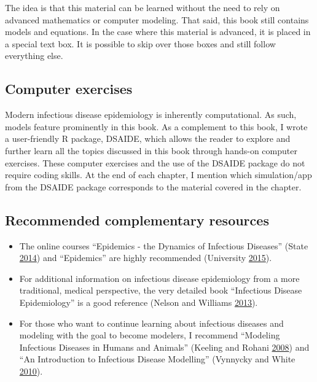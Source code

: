\documentclass[]{article}
\providecommand{\tightlist}{%
  \setlength{\itemsep}{0pt}\setlength{\parskip}{0pt}}
\theoremstyle{definition}
\theoremstyle{definition}
\theoremstyle{definition}
\theoremstyle{remark}
\begin{document}
The idea is that this material can be learned without the need to rely
on advanced mathematics or computer modeling. That said, this book still
contains models and equations. In the case where this material is
advanced, it is placed in a special text box. It is possible to skip
over those boxes and still follow everything else.

\subsection{Computer exercises}\label{computer-exercises}

Modern infectious disease epidemiology is inherently computational. As
such, models feature prominently in this book. As a complement to this
book, I wrote a user-friendly R package, DSAIDE, which allows the reader
to explore and further learn all the topics discussed in this book
through hands-on computer exercises. These computer exercises and the
use of the DSAIDE package do not require coding skills. At the end of
each chapter, I mention which simulation/app from the DSAIDE package
corresponds to the material covered in the chapter.

\subsection{Recommended complementary
resources}\label{recommended-complementary-resources}

\begin{itemize}
\tightlist
\item
  The online courses ``Epidemics - the Dynamics of Infectious Diseases''
  (State \protect\hyperlink{ref-epimooc}{2014}) and ``Epidemics'' are
  highly recommended (University
  \protect\hyperlink{ref-hkepidemics}{2015}).
\item
  For additional information on infectious disease epidemiology from a
  more traditional, medical perspective, the very detailed book
  ``Infectious Disease Epidemiology'' is a good reference (Nelson and
  Williams \protect\hyperlink{ref-nelson13}{2013}).
\item
  For those who want to continue learning about infectious diseases and
  modeling with the goal to become modelers, I recommend ``Modeling
  Infectious Diseases in Humans and Animals'' (Keeling and Rohani
  \protect\hyperlink{ref-keeling08}{2008}) and ``An Introduction to
  Infectious Disease Modelling'' (Vynnycky and White
  \protect\hyperlink{ref-vynnycky10}{2010}).
\end{itemize}
\end{document}
